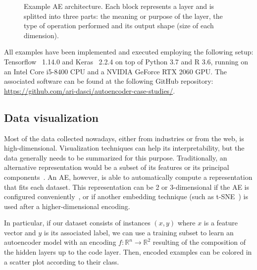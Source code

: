 \documentclass[
	fontsize=11pt, %
	twoside=false, %
	open=any, %
	secnumdepth=1, %
]{kaobook}
\begin{document}
\begin{figure}[ht]
    \centering\small
    \caption{Example AE architecture. Each block represents a layer and is splitted into three parts: the meaning or purpose of the layer, the type of operation performed and its output shape (size of each dimension).}
    \label{fig:exampleae}
\end{figure}

All examples have been implemented and executed employing the following setup: Tensorflow~\cite{tensorflow} 1.14.0 and Keras~\cite{keras} 2.2.4 on top of Python 3.7 and R 3.6, running on an Intel Core i5-8400 CPU and a NVIDIA GeForce RTX 2060 GPU. The associated software can be found at the following GitHub repository: \url{https://github.com/ari-dasci/autoencoder-case-studies/}.


\subsection{Data visualization}

Most of the data collected nowadays, either from industries or from the web, is high-dimensional. Visualization techniques can help its interpretability, but the data generally needs to be summarized for this purpose. Traditionally, an alternative representation would be a subset of its features or its principal components~\cite{jolliffe-pca}. An AE, however, is able to automatically compute a representation that fits each dataset. This representation can be 2 or 3-dimensional if the AE is configured conveniently~\cite{yu2013embedding}, or if another embedding technique (such as t-SNE~\cite{tsne}) is used after a higher-dimensional encoding.

In particular, if our dataset consists of instances $(x, y)$ where $x$ is a feature vector and $y$ is its associated label, we can use a training subset to learn an autoencoder model with an encoding $f: \mathbb R^n\rightarrow \mathbb R^2$ resulting of the composition of the hidden layers up to the code layer. Then, encoded examples can be colored in a scatter plot according to their class.
\end{document}
